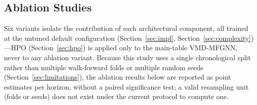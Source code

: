 \documentclass[journal]{IEEEtran}
\begin{document}
\subsection{Ablation Studies}
\label{sec:ablation}

Six variants isolate the contribution of each architectural component, all trained at the untuned default configuration (Section~\ref{sec:impl}, Section~\ref{sec:complexity})---HPO (Section~\ref{sec:hpo}) is applied only to the main-table VMD-MFGNN, never to any ablation variant. Because this study uses a single chronological split rather than multiple walk-forward folds or multiple random seeds (Section~\ref{sec:limitations}), the ablation results below are reported as point estimates per horizon, without a paired significance test; a valid resampling unit (folds or seeds) does not exist under the current protocol to compute one.
\end{document}
